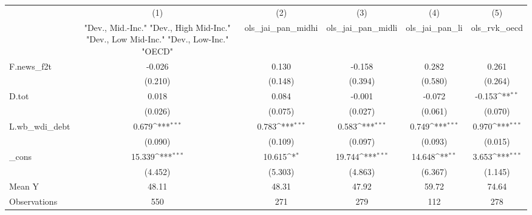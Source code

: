 {
\def\sym#1{\ifmmode^{#1}\else\(^{#1}\)\fi}
\begin{tabular}{l*{5}{c}}
\toprule
            &\multicolumn{1}{c}{(1)}&\multicolumn{1}{c}{(2)}&\multicolumn{1}{c}{(3)}&\multicolumn{1}{c}{(4)}&\multicolumn{1}{c}{(5)}\\
            &\multicolumn{1}{c}{ "Dev., Mid.-Inc." "Dev., High Mid-Inc." "Dev., Low Mid-Inc." "Dev., Low-Inc." "OECD" }&\multicolumn{1}{c}{ols\_jai\_pan\_midhi}&\multicolumn{1}{c}{ols\_jai\_pan\_midli}&\multicolumn{1}{c}{ols\_jai\_pan\_li}&\multicolumn{1}{c}{ols\_rvk\_oecd}\\
\midrule
F.news\_f2t  &      -0.026         &       0.130         &      -0.158         &       0.282         &       0.261         \\
            &     (0.210)         &     (0.148)         &     (0.394)         &     (0.580)         &     (0.264)         \\
\addlinespace
D.tot       &       0.018         &       0.084         &      -0.001         &      -0.072         &      -0.153\sym{**} \\
            &     (0.026)         &     (0.075)         &     (0.027)         &     (0.061)         &     (0.070)         \\
\addlinespace
L.wb\_wdi\_debt&       0.679\sym{***}&       0.783\sym{***}&       0.583\sym{***}&       0.749\sym{***}&       0.970\sym{***}\\
            &     (0.090)         &     (0.109)         &     (0.097)         &     (0.093)         &     (0.015)         \\
\addlinespace
\_cons      &      15.339\sym{***}&      10.615\sym{*}  &      19.744\sym{***}&      14.648\sym{**} &       3.653\sym{***}\\
            &     (4.452)         &     (5.303)         &     (4.863)         &     (6.367)         &     (1.145)         \\
\midrule
Mean Y      &       48.11         &       48.31         &       47.92         &       59.72         &       74.64         \\
Observations&         550         &         271         &         279         &         112         &         278         \\
\bottomrule
\end{tabular}
}
